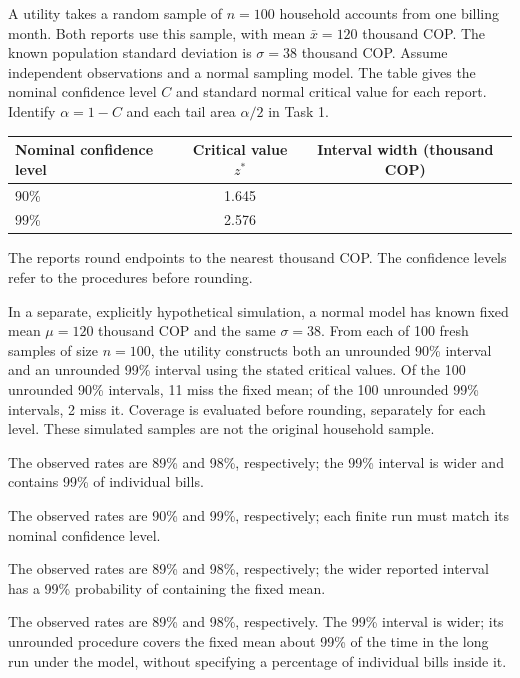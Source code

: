 A utility takes a random sample of $n=100$ household accounts from one billing month. Both reports use this sample, with mean $\bar{x}=120$ thousand COP. The known population standard deviation is $\sigma=38$ thousand COP. Assume independent observations and a normal sampling model. The table gives the nominal confidence level $C$ and standard normal critical value for each report. Identify $\alpha=1-C$ and each tail area $\alpha/2$ in Task 1.

\begin{center}
\begin{tabular}{@{}lcc@{}}
    \toprule
    Nominal confidence level & Critical value $z^*$ & Interval width (thousand COP) \\
    \midrule
    90\% & 1.645 & \\
    99\% & 2.576 & \\
    \bottomrule
\end{tabular}
\end{center}

The reports round endpoints to the nearest thousand COP. The confidence levels refer to the procedures before rounding.

In a separate, explicitly hypothetical simulation, a normal model has known fixed mean $\mu=120$ thousand COP and the same $\sigma=38$. From each of 100 fresh samples of size $n=100$, the utility constructs both an unrounded 90\% interval and an unrounded 99\% interval using the stated critical values. Of the 100 unrounded 90\% intervals, 11 miss the fixed mean; of the 100 unrounded 99\% intervals, 2 miss it. Coverage is evaluated before rounding, separately for each level. These simulated samples are not the original household sample.



\begin{answeroptions}
    \item The observed rates are 89\% and 98\%, respectively; the 99\% interval is wider and contains 99\% of individual bills.
    \item The observed rates are 90\% and 99\%, respectively; each finite run must match its nominal confidence level.
    \item The observed rates are 89\% and 98\%, respectively; the wider reported interval has a 99\% probability of containing the fixed mean.
    \item The observed rates are 89\% and 98\%, respectively. The 99\% interval is wider; its unrounded procedure covers the fixed mean about 99\% of the time in the long run under the model, without specifying a percentage of individual bills inside it.
\end{answeroptions}

